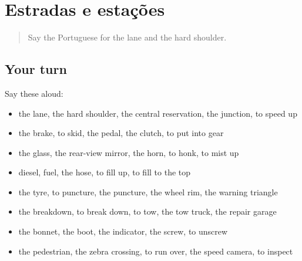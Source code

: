 \section[(dialogue)]{Estradas e estações}

\label{lesson:PT-R408-revisao-401-408}



\begin{quote}
Say the Portuguese for the lane and the hard shoulder.
\end{quote}

\subsection*{Your turn}
Say these aloud:

\begin{itemize}
\raggedright
  \item the lane, the hard shoulder, the central reservation, the junction, to speed up
  \item the brake, to skid, the pedal, the clutch, to put into gear
  \item the glass, the rear-view mirror, the horn, to honk, to mist up
  \item diesel, fuel, the hose, to fill up, to fill to the top
  \item the tyre, to puncture, the puncture, the wheel rim, the warning triangle
  \item the breakdown, to break down, to tow, the tow truck, the repair garage
  \item the bonnet, the boot, the indicator, the screw, to unscrew
  \item the pedestrian, the zebra crossing, to run over, the speed camera, to inspect
\end{itemize}

